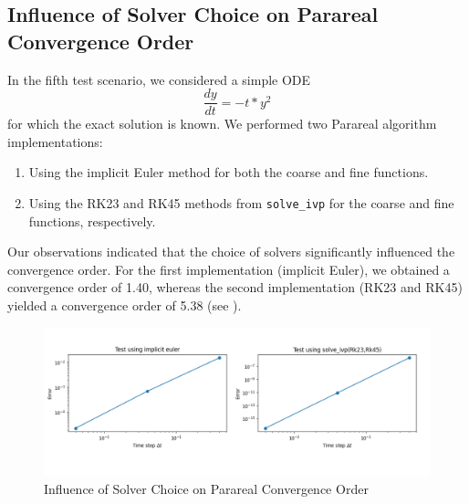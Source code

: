 \documentclass[a4paper,12pt,french]{article}
\begin{document}
\newpage

\subsection{Influence of Solver Choice on Parareal Convergence Order}
In the fifth test scenario, we considered a simple ODE $$\frac{dy}{dt} = -t * y^2$$
for which the exact solution is known. We performed two Parareal algorithm implementations:

\begin{enumerate}
    \item Using the implicit Euler method for both the coarse and fine functions.
    \item Using the RK23 and RK45 methods from \texttt{solve\_ivp} for the coarse and fine functions, respectively.
\end{enumerate}
Our observations indicated that the choice of solvers significantly influenced the convergence order. For the first implementation (implicit Euler), we obtained a convergence order of 1.40, whereas the second implementation (RK23 and RK45) yielded a convergence order of 5.38 (see ).

\begin{figure}[ht!]
    \centering
    \includegraphics[width=1\textwidth]{img/order_converge.png}
    \caption{Influence of Solver Choice on Parareal Convergence Order}
    \label{fig:9}
\end{figure}
   

%
%
\end{document}
